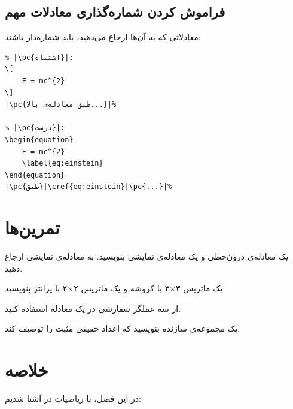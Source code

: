 \subsection{فراموش کردن شماره‌گذاری معادلات مهم}
\label{sec:math-mistake-label}

معادلاتی که به آن‌ها ارجاع می‌دهید، باید
شماره‌دار باشند:

\begin{latin}
\begin{verbatim}
% |\pc{اشتباه}|:
\[
    E = mc^{2}
\]
|\pc{طبق معادله‌ی بالا...}|%

% |\pc{درست}|:
\begin{equation}
    E = mc^{2}
    \label{eq:einstein}
\end{equation}
|\pc{طبق}|\cref{eq:einstein}|\pc{...}|%
\end{verbatim}
\end{latin}

\section{تمرین‌ها}
\label{sec:math-exercises}

\begin{exercise}
    یک معادله‌ی درون‌خطی و یک معادله‌ی نمایشی
    بنویسید. به معادله‌ی نمایشی ارجاع دهید.
    \label{exc:math-equation}
\end{exercise}

\begin{exercise}
    یک ماتریس ۳×۳ با کروشه و یک ماتریس ۲×۲
    با پرانتز بنویسید.
    \label{exc:math-matrix}
\end{exercise}

\begin{exercise}
    از سه عملگر سفارشی  در یک
    معادله استفاده کنید.
    \label{exc:math-operators}
\end{exercise}

\begin{exercise}
    یک مجموعه‌ی سازنده بنویسید که اعداد
    حقیقی مثبت را توصیف کند.
    \label{exc:math-set}
\end{exercise}

\section{خلاصه}
\label{sec:math-summary}

در این فصل، با ریاضیات در 
آشنا شدیم:

